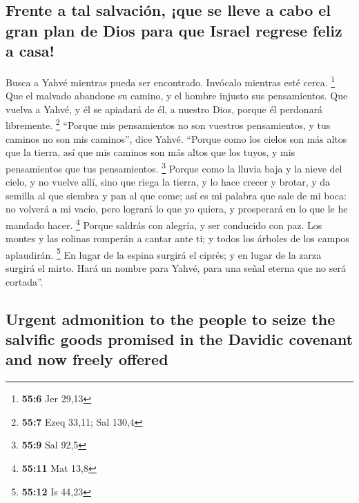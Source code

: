 \begin{paracol}{2}
\hypertarget{frente-a-tal-salvaciuxf3n-que-se-lleve-a-cabo-el-gran-plan-de-dios-para-que-israel-regrese-feliz-a-casa}{%
\subsection{Frente a tal salvación, ¡que se lleve a cabo el gran plan de
Dios para que Israel regrese feliz a
casa!}\label{frente-a-tal-salvaciuxf3n-que-se-lleve-a-cabo-el-gran-plan-de-dios-para-que-israel-regrese-feliz-a-casa}}

 Busca a Yahvé mientras pueda ser encontrado. Invócalo
mientras esté cerca. \footnote{\textbf{55:6} Jer 29,13} 
Que el malvado abandone su camino, y el hombre injusto sus pensamientos.
Que vuelva a Yahvé, y él se apiadará de él, a nuestro Dios, porque él
perdonará libremente. \footnote{\textbf{55:7} Ezeq 33,11; Sal 130,4}
 ``Porque mis pensamientos no son vuestros pensamientos, y
tus caminos no son mis caminos'', dice Yahvé.  ``Porque
como los cielos son más altos que la tierra, así que mis caminos son más
altos que los tuyos, y mis pensamientos que tus pensamientos.
\footnote{\textbf{55:9} Sal 92,5}  Porque como la lluvia
baja y la nieve del cielo, y no vuelve allí, sino que riega la tierra, y
lo hace crecer y brotar, y da semilla al que siembra y pan al que come;
 así es mi palabra que sale de mi boca: no volverá a mi
vacío, pero logrará lo que yo quiera, y prosperará en lo que le he
mandado hacer. \footnote{\textbf{55:11} Mat 13,8}  Porque
saldrás con alegría, y ser conducido con paz. Los montes y las colinas
romperán a cantar ante ti; y todos los árboles de los campos aplaudirán.
\footnote{\textbf{55:12} Is 44,23}  En lugar de la espina
surgirá el ciprés; y en lugar de la zarza surgirá el mirto. Hará un
nombre para Yahvé, para una señal eterna que no será cortada''.

\switchcolumn
\begin{otherlanguage}{english}

\hypertarget{urgent-admonition-to-the-people-to-seize-the-salvific-goods-promised-in-the-davidic-covenant-and-now-freely-offered}{%
\subsection{Urgent admonition to the people to seize the salvific goods
promised in the Davidic covenant and now freely
offered}\label{urgent-admonition-to-the-people-to-seize-the-salvific-goods-promised-in-the-davidic-covenant-and-now-freely-offered}}


\end{otherlanguage}
\end{paracol}
